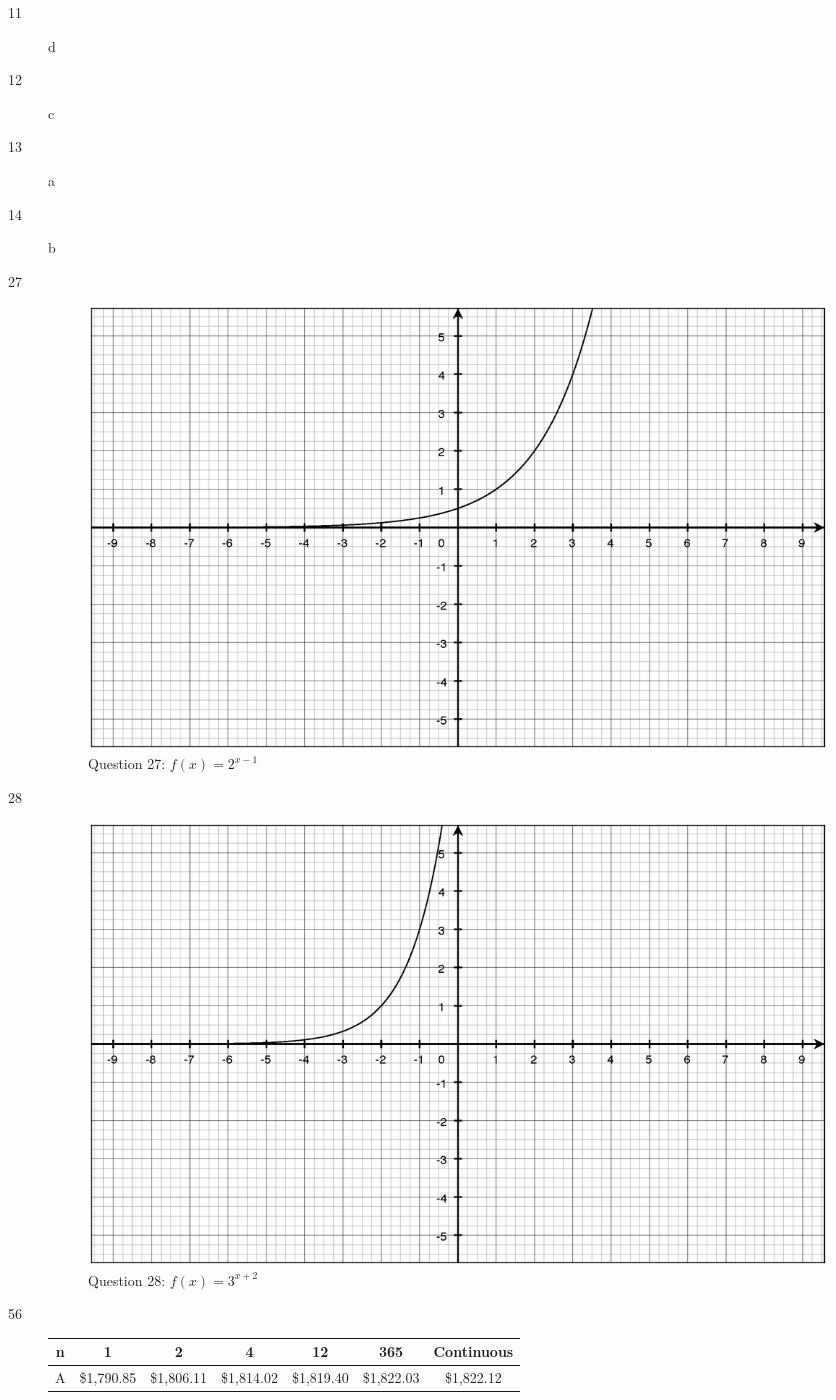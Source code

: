 \documentclass[fleqn,addpoints]{exam}
\begin{document}
\begin{description}

\item[11] d
\item[12] c
\item[13] a
\item[14] b

\item[27]
\begin{figure}[H]
  \centering
  \includegraphics[scale=.3]{question27.eps}
  \caption*{Question 27: $f(x) = 2^{x-1}$}
\end{figure}

\item[28]
\begin{figure}[H]
  \centering
  \includegraphics[scale=.3]{question28.eps}
  \caption*{Question 28: $f(x) = 3^{x+2}$}
\end{figure}

\item[56]
\begin{tabular}{|c||c|c|c|c|c|c|}
\hline
n & 1 & 2 & 4 & 12 & 365 & Continuous \\
\hline 
A & \$1,790.85 & \$1,806.11 & \$1,814.02 & \$1,819.40 & \$1,822.03 & \$1,822.12 \\
\hline 
\end{tabular}


\end{description}
\end{document}
